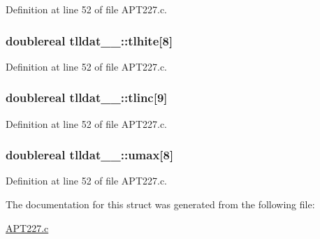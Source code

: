 Definition at line 52 of file A\+P\+T227.\+c.

\subsubsection[{\texorpdfstring{tlhite}{tlhite}}]{\setlength{\rightskip}{0pt plus 5cm}doublereal tlldat\+\_\+\_\+\+::tlhite\mbox{[}8\mbox{]}}\hypertarget{structtlldat__1___af8ae88a6e2749f071343c0bbd8d21312}{}\label{structtlldat__1___af8ae88a6e2749f071343c0bbd8d21312}


Definition at line 52 of file A\+P\+T227.\+c.

\subsubsection[{\texorpdfstring{tlinc}{tlinc}}]{\setlength{\rightskip}{0pt plus 5cm}doublereal tlldat\+\_\+\_\+\+::tlinc\mbox{[}9\mbox{]}}\hypertarget{structtlldat__1___a29199fa8f0907c4736bf18679f9bab22}{}\label{structtlldat__1___a29199fa8f0907c4736bf18679f9bab22}


Definition at line 52 of file A\+P\+T227.\+c.

\subsubsection[{\texorpdfstring{umax}{umax}}]{\setlength{\rightskip}{0pt plus 5cm}doublereal tlldat\+\_\+\_\+\+::umax\mbox{[}8\mbox{]}}\hypertarget{structtlldat__1___adfd9022cc343aa8a84e3db6e6ce228f5}{}\label{structtlldat__1___adfd9022cc343aa8a84e3db6e6ce228f5}


Definition at line 52 of file A\+P\+T227.\+c.



The documentation for this struct was generated from the following file\+:\begin{DoxyCompactItemize}
\item 
\hyperlink{APT227_8c}{A\+P\+T227.\+c}\end{DoxyCompactItemize}
